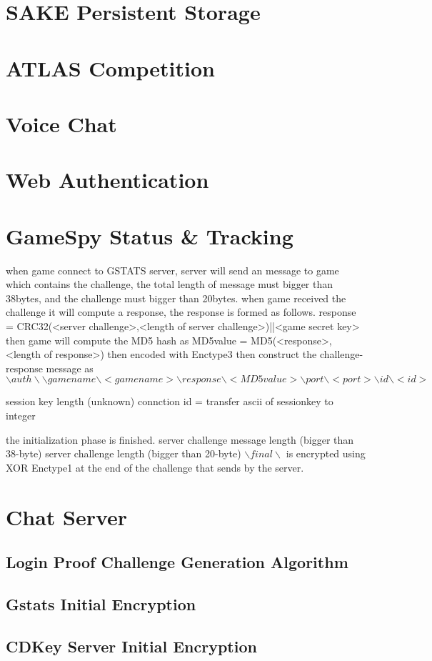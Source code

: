 \documentclass[oneside,titlepage,a4paper]{Definition/retrospy} %
\begin{document}
\part{SAKE Persistent Storage}
\part{ATLAS Competition}
\part{Voice Chat}
\part{Web Authentication}

\part{GameSpy Status \& Tracking}
when game connect to GSTATS server, server will send an message to game which contains the challenge, the total length of message must bigger than 38bytes, and the challenge must bigger than 20bytes.
when game received the challenge it will compute a response, the response is formed as follows. 
response = CRC32(<server challenge>,<length of server challenge>)||<game secret key>
then game will compute the MD5 hash as MD5value = MD5(<response>,<length of response>)
then encoded with Enctype3
then construct the challenge-response message as $ \backslash auth \backslash \backslash gamename \backslash <gamename>\backslash response \backslash <MD5value> \backslash port \backslash <port> \backslash id \backslash <id> $

session key length (unknown)
connction id = transfer ascii of sessionkey to integer

the initialization phase is finished.
server challenge message length (bigger than 38-byte)
server challenge length (bigger than 20-byte)
$ \backslash final \backslash $ is encrypted using XOR Enctype1 at the end of the challenge that sends by the server.

\part{Chat Server}






\begin{appendix}
\chapter{Login Proof Challenge Generation Algorithm}\label{Login Proof Challenge Gerneration Algorithm}
\chapter{Gstats Initial Encryption}
\chapter{CDKey Server Initial Encryption}
\end{appendix}
\end{document}
